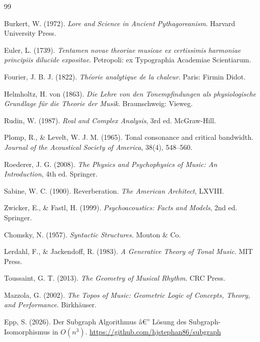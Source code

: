 ﻿\documentclass[a4paper,12pt]{article}
\theoremstyle{definition}
\begin{document}
\begin{thebibliography}{99}

Burkert, W. (1972).
\textit{Lore and Science in Ancient Pythagoreanism}.
Harvard University Press.

Euler, L. (1739).
\textit{Tentamen novae theoriae musicae ex certissimis harmoniae principiis dilucide expositae}.
Petropoli: ex Typographia Academiae Scientiarum.

Fourier, J. B. J. (1822).
\textit{Théorie analytique de la chaleur}.
Paris: Firmin Didot.

Helmholtz, H. von (1863).
\textit{Die Lehre von den Tonempfindungen als physiologische Grundlage für die
Theorie der Musik}.
Braunschweig: Vieweg.

Rudin, W. (1987).
\textit{Real and Complex Analysis}, 3rd ed.
McGraw-Hill.

Plomp, R., \& Levelt, W. J. M. (1965).
Tonal consonance and critical bandwidth.
\textit{Journal of the Acoustical Society of America}, 38(4), 548--560.

Roederer, J. G. (2008).
\textit{The Physics and Psychophysics of Music: An Introduction}, 4th ed.
Springer.

Sabine, W. C. (1900).
Reverberation.
\textit{The American Architect}, LXVIII.

Zwicker, E., \& Fastl, H. (1999).
\textit{Psychoacoustics: Facts and Models}, 2nd ed.
Springer.

Chomsky, N. (1957).
\textit{Syntactic Structures}.
Mouton \& Co.

Lerdahl, F., \& Jackendoff, R. (1983).
\textit{A Generative Theory of Tonal Music}.
MIT Press.

Toussaint, G. T. (2013).
\textit{The Geometry of Musical Rhythm}.
CRC Press.

Mazzola, G. (2002).
\textit{The Topos of Music: Geometric Logic of Concepts, Theory, and Performance}.
Birkhäuser.

Epp, S. (2026).
Der Subgraph Algorithmus â€” Lösung des Subgraph-Isomorphismus in $O(n^3)$. \url{https://github.com/hjstephan86/subgraph}


\end{thebibliography}
\end{document}

